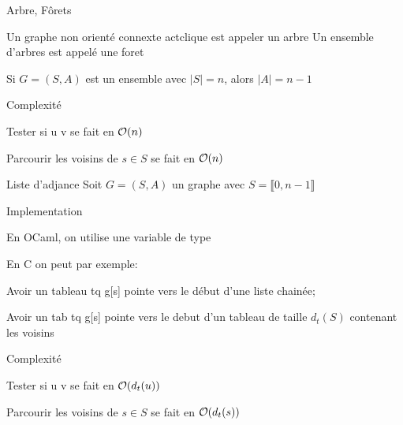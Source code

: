 \documentclass[a4paper,french,bookmarks]{article}
\begin{document}
    \begin{definition}{Arbre, Fôrets}{}
        
        Un graphe non orienté connexte actclique est appeler un arbre 
        Un ensemble d'arbres est appelé une foret
    
    \end{definition}

    \begin{theorem}{}{}
        Si $G = (S,A) $ est un ensemble avec $|S| = n$, alors $|A| = n-1$
    \end{theorem}
    
    
    
    \begin{form}{Complexité}{}
        \begin{enumerate}
            \itt Tester si u \to v se fait en $\mathcal{O}(n)$
            
            \itt Parcourir les voisins de $s\in S$ se fait en $\mathcal{O}(n)$
        \end{enumerate}
    \end{form}
    
    
    \begin{definition}{Liste d'adjance}{}
        Soit $G = (S,A)$ un graphe avec $S = \llbracket 0, n-1 \rrbracket$
    \end{definition}
    \begin{form}{Implementation}{}
        \begin{enumerate}
            \itt En OCaml, on utilise une variable de type 
            
            \itt En C on peut par exemple:
                \begin{enumerate}
                    
                    \itt Avoir un tableau tq g[s] pointe vers le début d'une liste chainée;
                    
                    \itt Avoir un tab tq g[s] pointe vers le debut d'un tableau de taille $d_t(S)$
                    contenant les voisins 
                \end{enumerate}
        \end{enumerate}
    \end{form}
    \begin{form}{Complexité}{}
        \begin{enumerate}
            
            \itt Tester si u \to v se fait en $\mathcal{O}(d_t(u))$
            
            \itt Parcourir les voisins de $s \in S$ se fait en $\mathcal{O}(d_t(s))$
        \end{enumerate}
    \end{form}
\end{document}
